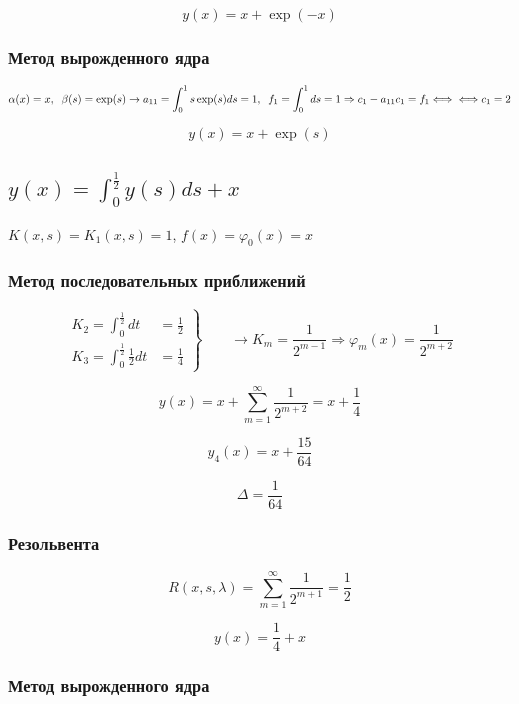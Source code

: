 \documentclass[
11pt,
master, %
subf, %
href, %
colorlinks=true, %
times, %
]{disser}
\begin{document}
$$y(x) = x + \exp(-x)$$

\subsubsection{Метод вырожденного ядра}

$\displaystyle\alpha(x) = x,\;\;\beta(s) = \exp(s) \rightarrow a_{11} = \int_{0}^{1} s \exp(s) ds = 1, \;\; f_1 = \int_{0}^{1} ds = 1 \Rightarrow c_1 - a_{11} c_1 = f_1 \Longleftrightarrow\\
\Longleftrightarrow c_1 = 2$

$$y(x) = x + \exp(s)$$

\subsection{$\displaystyle y(x) =  \int_{0}^{\frac{1}{2}} y(s)ds + x$}

$K(x,s) = K_1(x,s) = 1$, $f(x)= \varphi_0(x) = x$

\subsubsection{Метод последовательных приближений}

\begin{equation}
 \left.\begin{aligned}
        K_2 = \int_{0}^{\frac{1}{2}} dt  &= \frac{1}{2}\\
        K_3 = \int_{0}^{\frac{1}{2}} \frac{1}{2} dt &= \frac{1}{4}
       \end{aligned}
 \right\}
 \qquad \longrightarrow K_m = \frac{1}{2^{m-1}} \Rightarrow \varphi_m(x) = \frac{1}{2^{m+2}}
\end{equation}

$$y(x) = x + \sum_{m=1}^{\infty}\frac{1}{2^{m+2}} = x + \frac{1}{4}$$

$$y_4(x) = x + \frac{15}{64}$$

$$\Delta = \frac{1}{64}$$

\subsubsection{Резольвента}

$$R(x,s,\lambda) = \sum_{m=1}^{\infty} \frac{1}{2^{m+1}} = \frac{1}{2}$$

$$y(x) = \frac{1}{4} + x$$

\newpage
\subsubsection{Метод вырожденного ядра}
\end{document}
